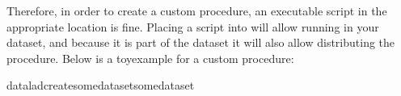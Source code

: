 \sphinxAtStartPar
Therefore, in order to create a custom procedure, an executable script
in the appropriate location is fine. Placing a script 
into  will allow running
 in your dataset, and because
it is part of the dataset it will also allow distributing the procedure.
Below is a toy\sphinxhyphen{}example for a custom procedure:

\begin{sphinxVerbatim}[commandchars=\\\{\}]
dataladcreatesomedatasetsomedataset
\end{sphinxVerbatim}

